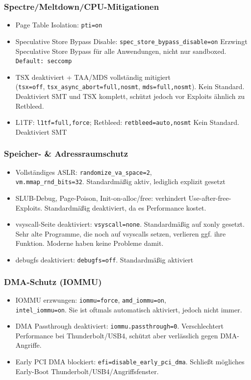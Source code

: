 \subsubsection*{Spectre/Meltdown/CPU-Mitigationen}
\begin{itemize}
\item Page Table Isolation: \texttt{pti=on}
  \item Speculative Store Bypass Disable: \texttt{spec\_store\_bypass\_disable=on} Erzwingt Speculative Store Bypass für alle Anwendungen, nicht nur sandboxed. \texttt{Default: seccomp}
  \item \acs{TSX} deaktiviert + \acs{TAA}/\acs{MDS} vollständig mitigiert\\
  (\texttt{tsx=off}, \texttt{tsx\_async\_abort=full,nosmt}, \texttt{mds=full,nosmt}). Kein Standard. Deaktiviert \ac{SMT} und \ac{TSX} komplett, schützt jedoch vor Exploits ähnlich zu Retbleed. 
  \item \acs{L1TF}: \texttt{l1tf=full,force}; Retbleed: \texttt{retbleed=auto,nosmt} Kein Standard. Deaktiviert \ac{SMT} 
\end{itemize}

\subsubsection*{Speicher- \& Adressraumschutz}
\begin{itemize}
 \item Vollständiges \acs{ASLR}: \texttt{\textcolor{OliveGreen}{randomize\_va\_space=2}},\\ \texttt{\textcolor{OliveGreen}{vm.mmap\_rnd\_bits=32}}. Standardmäßig aktiv, lediglich explizit gesetzt
  \item \acs{SLUB}-Debug, Page-Poison, Init-on-alloc/free: verhindert Use-after-free-Exploits. Standardmäßig deaktiviert, da es Performance kostet.
  \item vsyscall-Seite deaktiviert: \texttt{vsyscall=none}. Standardmäßig auf xonly gesetzt. Sehr alte Programme, die noch auf vsyscalls setzen, verlieren ggf. ihre Funktion. Moderne haben keine Probleme damit.
  \item debugfs deaktiviert: \texttt{debugfs=off}. Standardmäßig aktiviert
\end{itemize}

\subsubsection*{\acs{DMA}-Schutz (\acs{IOMMU})}
\begin{itemize}
  \item \acs{IOMMU} erzwungen: \texttt{iommu=force}, \texttt{amd\_iommu=on}, \\\texttt{intel\_iommu=on}. Sie ist oftmals automatisch aktiviert, jedoch nicht immer.
  \item \acs{DMA} Passthrough deaktiviert: \texttt{iommu.passthrough=0}. Verschlechtert Performance bei Thunderbolt/\acs{USB}4, schützt aber verlässlich gegen \acs{DMA}-Angriffe.
  \item Early \acs{PCI} \acs{DMA} blockiert: \texttt{efi=disable\_early\_pci\_dma}. Schließt mögliches Early-Boot Thunderbolt/\acs{USB}4/Angriffsfenster.
\end{itemize}


